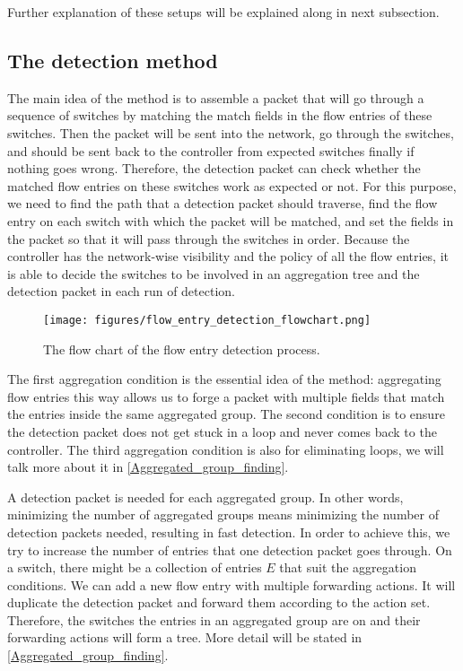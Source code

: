 Further explanation of these setups will be explained along in next subsection.

\subsection{The detection method}
\label{Detection_method}

The main idea of the method is to assemble a packet that will go through a sequence of switches by matching the match fields in the flow entries of these switches. Then the packet will be sent into the network, go through the switches, and should be sent back to the controller from expected switches finally if nothing goes wrong. Therefore, the detection packet can check whether the matched flow entries on these switches work as expected or not. For this purpose, we need to find the path that a detection packet should traverse, find the flow entry on each switch with which the packet will be matched, and set the fields in the packet so that it will pass through the switches in order. Because the controller has the network-wise visibility and the policy of all the flow entries, it is able to decide the switches to be involved in an aggregation tree and the detection packet in each run of detection. 

\begin{figure}[H]
\begin{center} 
\texttt{[image: figures/flow\_entry\_detection\_flowchart.png]}
\end{center}
\caption{The flow chart of the flow entry detection process.}
\label{flow_entry_detection_flowchart}
\end{figure}


The first aggregation condition is the essential idea of the method: aggregating flow entries this way allows us to forge a packet with multiple fields that match the entries inside the same aggregated group. The second condition is to ensure the detection packet does not get stuck in a loop and never comes back to the controller. The third aggregation condition is also for eliminating loops, we will talk more about it in \ref{Aggregated_group_finding}.

A detection packet is needed for each aggregated group. In other words, minimizing the number of aggregated groups means minimizing the number of detection packets needed, resulting in fast detection. In order to achieve this, we try to increase the number of entries that one detection packet goes through. On a switch, there might be a collection of entries $E$ that suit the aggregation conditions. We can add a new flow entry with multiple forwarding actions. It will duplicate the detection packet and forward them according to the action set. Therefore, the switches the entries in an aggregated group are on and their forwarding actions will form a tree. More detail will be stated in \ref{Aggregated_group_finding}.

